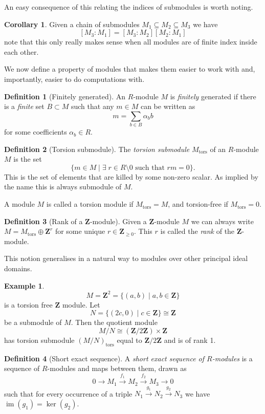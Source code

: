 \documentclass[12pt,a4paper,abstracton,bibtotoc]{scrreprt}
\theoremstyle{definition}
\newtheorem{cor}{Corollary}
\newtheorem{defn}{Definition}
\newtheorem{ex}{Example}
\newcommand{\ZZ}{\mathbf{Z}}
\DeclareMathOperator{\im}{im}
\begin{document}
An easy consequence of this relating the indices of submodules is worth noting.

\begin{cor}
\label{cor:indexmult}
Given a chain of submodules $M_1 \subseteq M_2 \subseteq M_3$ we have
\[
[M_3:M_1] = [M_3:M_2][M_2:M_1]
\]
note that this only really makes sense when all modules are of finite index inside each other.
\end{cor}

\minisec{}
We now define a property of modules that makes them easier to work with and, importantly, easier to do computations with.

\begin{defn}[Finitely generated]
An $R$-module $M$ is \emph{finitely} generated if there is a \emph{finite} set $B\subset M$ such that any $m\in M$ can be written as
\[m = \sum_{b\in B} \alpha_b b\]
for some coefficients $\alpha_b \in R$.
\end{defn}

\begin{defn}[Torsion submodule]
The \emph{torsion submodule} $M_\text{tors}$ of an $R$-module $M$ is the set
\[
\{m\in M \mid \exists\; r \in R\setminus 0 \text{ such that } rm = 0\}.
\]
This is the set of elements that are killed by some non-zero scalar.
As implied by the name this is always submodule of $M$.
\end{defn}

A module $M$ is called a torsion module if $M_\text{tors} = M$, and torsion-free if $M_\text{tors} = 0$.

\begin{defn}[Rank of a $\ZZ$-module]
Given a $\ZZ$-module $M$ we can always write $M = M_\text{tors} \oplus \ZZ^r$ for some unique $r\in \ZZ_{\ge 0}$.
This $r$ is called the \emph{rank} of the $\ZZ$-module.
\end{defn}

This notion generalises in a natural way to modules over other principal ideal domains.

\begin{ex}
\[M = \ZZ^2 = \{(a,b)\mid a,b\in \ZZ\}\]
is a torsion free $\ZZ$ module. Let
\[N = \{(2c,0) \mid c\in\ZZ\} \cong \ZZ\]
be a submodule of $M$.
Then the quotient module
\[M/N \cong (\ZZ/2\ZZ)\times \ZZ\]
has torsion submodule $(M/N)_\text{tors}$ equal to $\ZZ/2\ZZ$ and is of rank 1.
\end{ex}

\begin{defn}[Short exact sequence]
A \emph{short exact sequence of $R$-modules} is a sequence of $R$-modules and maps between them, drawn as
\[
0 \to M_1 \xrightarrow{f_1} M_2 \xrightarrow{f_2} M_3 \to 0
\]
such that for every occurrence of a triple $N_1 \xrightarrow{g_1} N_2 \xrightarrow{g_2} N_3$ we have $\im(g_1) = \ker(g_2)$.
\end{defn}
\end{document}
